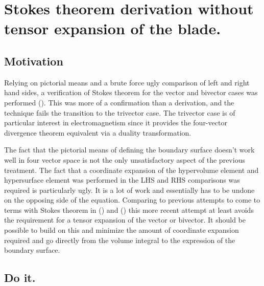 %

\chapter{Stokes theorem derivation without tensor expansion of the blade.}
\label{chap:stokesNoTensor}


\date{July 21, 2009.  $RCSfile: stokesNoTensor.tex,v $ Last $Revision: 1.10 $ $Date: 2009/10/22 02:07:20 $}

\beginArtWithToc

\section{Motivation}

Relying on pictorial means and a brute force ugly comparison of left and right hand sides, a verification of Stokes theorem for the vector and bivector cases was performed ().  This was more of a confirmation than a derivation, and the technique fails the transition to the trivector case.  The trivector case is of particular interest in electromagnetism since it provides the four-vector divergence theorem equivalent via a duality transformation.

The fact that the pictorial means of defining the boundary surface doesn't work well in four vector space is not the only unsatisfactory aspect of the previous treatment.  The fact that a coordinate expansion of the hypervolume element and hypersurface element was performed in the LHS and RHS comparisons was required is particularly ugly.  It is a lot of work and essentially has to be undone on the opposing side of the equation.  Comparing to previous attempts to come to terms with Stokes theorem in () and () this more recent attempt at least avoids the requirement for a tensor expansion of the vector or bivector.  It should be possible to build on this and minimize the amount of coordinate expansion required and go directly from the volume integral to the expression of the boundary surface.

\section{Do it.}
